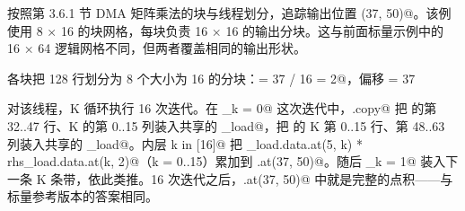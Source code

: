 按照第 3.6.1 节 DMA 矩阵乘法的块与线程划分，追踪输出位置 \co@(37, 50)@。该例使用 8 × 16 的块网格，每块负责 16 × 16 的输出分块。这与前面标量示例中的 16 × 64 逻辑网格不同，但两者覆盖相同的输出形状。

各块把 128 行划分为 8 个大小为 16 的分块：\co@px = 37 / 16 = 2@，偏移 \co@qx = 37 %

对该线程，K 循环执行 16 次迭代。在 \co@tile_k = 0@ 这次迭代中，\co@dma.copy@ 把 \co@lhs@ 的第 32..47 行、K 的第 0..15 列装入共享的 \co@lhs_load@，把 \co@rhs@ 的 K 第 0..15 行、第 48..63 列装入共享的 \co@rhs_load@。内层 \co@foreach k in [16]@ 把 \co@lhs_load.data.at(5, k) * rhs_load.data.at(k, 2)@（k = 0..15）累加到 \co@output.at(37, 50)@。随后 \co@tile_k = 1@ 装入下一条 K 条带，依此类推。16 次迭代之后，\co@output.at(37, 50)@ 中就是完整的点积——与标量参考版本的答案相同。
